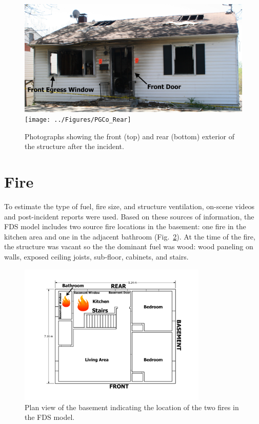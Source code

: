 \documentclass[12pt,oneside]{book}
\begin{document}
\begin{figure}[!ht]
\includegraphics[width=5in]{../Figures/PGCo_Front} \\ 
\vspace{0.1in}
\texttt{[image: ../Figures/PGCo\_Rear]}
\caption{Photographs showing the front (top) and rear (bottom) exterior of the structure after the incident.}
\label{fig:exterior}
\end{figure}

\clearpage

\section{Fire}
\label{fire}
To estimate the type of fuel, fire size, and structure ventilation, on-scene videos and post-incident reports were used. Based on these sources of information, the FDS model includes two source fire locations in the basement: one fire in the kitchen area and one in the adjacent bathroom (Fig.~\ref{fig:basement_fire}). At the time of the fire, the structure was vacant so the the dominant fuel was wood: wood paneling on walls, exposed ceiling joists, sub-floor, cabinets, and stairs.

\begin{figure}[!ht]
\includegraphics[width=0.8\textwidth]{../Figures/Basement_Fire}
\caption[Plan view of basement indicating fire location.]{Plan view of the basement indicating the location of the two fires in the FDS model.}
\label{fig:basement_fire}
\end{figure}
\end{document}
